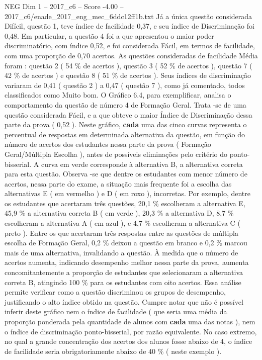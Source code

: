 \begin{textsample}{NEG Dim 1 – 2017\_c6 – Score -4.00 – 2017\_c6/enade\_2017\_eng\_mec\_6ddc12ff1b.txt}
Já a única questão considerada Difícil, questão 1, teve índice de facilidade 0,37, e seu índice de Discriminação foi 0,48.
Em particular, a questão 4 foi a que apresentou o maior poder discriminatório, com índice 0,52, e foi considerada Fácil, em termos de facilidade, com uma proporção de 0,70 acertos.
As questões consideradas de facilidade Média foram : questão 2 ( 54 \% de acertos ), questão 3 ( 52 \% de acertos ), questão 7 ( 42 \% de acertos ) e questão 8 ( 51 \% de acertos ).
Seus índices de discriminação variaram de 0,41 ( questão 2 ) a 0,47 ( questão 7 ), como já comentado, todos classificados como Muito bom.
O Gráfico 6.4, para exemplificar, analisa o comportamento da questão de número 4 de Formação Geral.
Trata -se de uma questão considerada Fácil, e a que obteve o maior Índice de Discriminação dessa parte da prova ( 0,52 ).
Neste gráfico, \textbf{cada} uma das cinco curvas representa o percentual de respostas em determinada alternativa da questão, em função do número de acertos dos estudantes nessa parte da prova ( Formação Geral/Múltipla Escolha ), antes de possíveis eliminações pelo critério do ponto-bisserial.
A curva em verde corresponde à alternativa B, a alternativa correta para esta questão.
Observa -se que dentre os estudantes com menor número de acertos, nessa parte do exame, a situação mais frequente foi a escolha das alternativas E ( em vermelho ) e D ( em roxo ), incorretas.
Por exemplo, dentre os estudantes que acertaram três questões, 20,1 \% escolheram a alternativa E, 45,9 \% a alternativa correta B ( em verde ), 20,3 \% a alternativa D, 8,7 \% escolheram a alternativa A ( em azul ), e 4,7 \% escolheram a alternativa C ( preto ).
Entre os que acertaram três respostas entre as questões de múltipla escolha de Formação Geral, 0,2 \% deixou a questão em branco e 0,2 \% marcou mais de uma alternativa, invalidando a questão.
À medida que o número de acertos aumenta, indicando desempenho melhor nessa parte da prova, aumenta concomitantemente a proporção de estudantes que selecionaram a alternativa correta B, atingindo 100 \% para os estudantes com oito acertos.
Essa análise permite verificar como a questão discriminou os grupos de desempenho, justificando o alto índice obtido na questão.
Cumpre notar que não é possível inferir deste gráfico nem o índice de facilidade ( que seria uma média da proporção ponderada pela quantidade de alunos com \textbf{cada} uma das notas ), nem o índice de discriminação ponto-bisserial, por razão equivalente.
No caso extremo, no qual a grande concentração dos acertos dos alunos fosse abaixo de 4, o índice de facilidade seria obrigatoriamente abaixo de 40 \% ( neste exemplo ).

\end{textsample}
